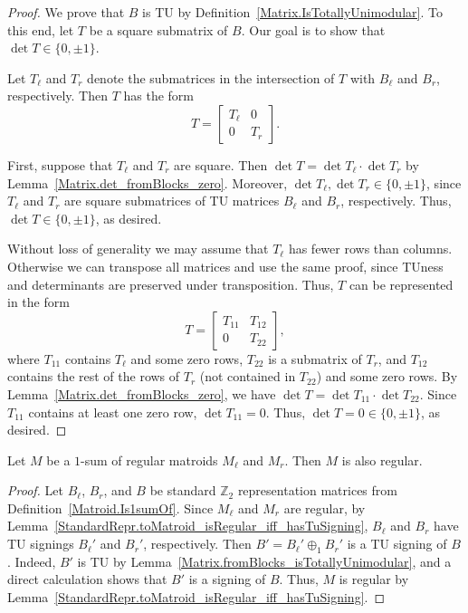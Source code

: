 \begin{proof}
    \leanok
    We prove that $B$ is TU by Definition~\ref{Matrix.IsTotallyUnimodular}. To this end, let $T$ be a square submatrix of $B$. Our goal is to show that $\det T \in \{0, \pm 1\}$.

    Let $T_{\ell}$ and $T_{r}$ denote the submatrices in the intersection of $T$ with $B_{\ell}$ and $B_{r}$, respectively. Then $T$ has the form
    \[
        T = \begin{bmatrix} T_{\ell} & 0 \\ 0 & T_{r} \end{bmatrix}.
    \]

    First, suppose that $T_{\ell}$ and $T_{r}$ are square. Then $\det T = \det T_{\ell} \cdot \det T_{r}$ by Lemma~\ref{Matrix.det_fromBlocks_zero}. Moreover, $\det T_{\ell}, \det T_{r} \in \{0, \pm 1\}$, since $T_{\ell}$ and $T_{r}$ are square submatrices of TU matrices $B_{\ell}$ and $B_{r}$, respectively. Thus, $\det T \in \{0, \pm 1\}$, as desired.

    Without loss of generality we may assume that $T_{\ell}$ has fewer rows than columns. Otherwise we can transpose all matrices and use the same proof, since TUness and determinants are preserved under transposition. Thus, $T$ can be represented in the form
    \[
        T = \begin{bmatrix} T_{11} & T_{12} \\ 0 & T_{22} \end{bmatrix},
    \]
    where $T_{11}$ contains $T_{\ell}$ and some zero rows, $T_{22}$ is a submatrix of $T_{r}$, and $T_{12}$ contains the rest of the rows of $T_{r}$ (not contained in $T_{22}$) and some zero rows. By Lemma~\ref{Matrix.det_fromBlocks_zero}, we have $\det T = \det T_{11} \cdot \det T_{22}$. Since $T_{11}$ contains at least one zero row, $\det T_{11} = 0$. Thus, $\det T = 0 \in \{0, \pm 1\}$, as desired.
\end{proof}

\begin{theorem}
    \label{Matroid.Is1sumOf.isRegular}
    \leanok
    Let $M$ be a $1$-sum of regular matroids $M_{\ell}$ and $M_{r}$. Then $M$ is also regular.
\end{theorem}

\begin{proof}
    \leanok
    Let $B_{\ell}$, $B_{r}$, and $B$ be standard $\mathbb{Z}_{2}$ representation matrices from Definition~\ref{Matroid.Is1sumOf}. Since $M_{\ell}$ and $M_{r}$ are regular, by Lemma~\ref{StandardRepr.toMatroid_isRegular_iff_hasTuSigning}, $B_{\ell}$ and $B_{r}$ have TU signings $B_{\ell}'$ and $B_{r}'$, respectively. Then $B' = B_{\ell}' \oplus_{1} B_{r}'$ is a TU signing of $B$. Indeed, $B'$ is TU by Lemma~\ref{Matrix.fromBlocks_isTotallyUnimodular}, and a direct calculation shows that $B'$ is a signing of $B$. Thus, $M$ is regular by Lemma~\ref{StandardRepr.toMatroid_isRegular_iff_hasTuSigning}.
\end{proof}
